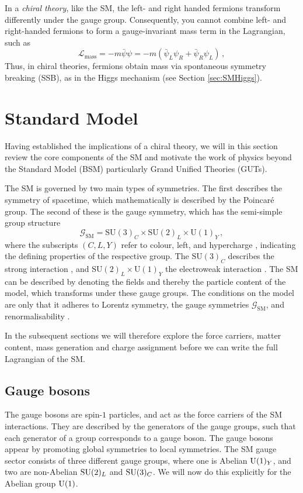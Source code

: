 In a \textit{chiral theory}, like the SM, the left- and right handed fermions transform differently under the gauge group. Consequently, you cannot combine left- and right-handed fermions to form a gauge-invariant mass term in the Lagrangian, such as 
\begin{equation}
    \mathcal{L}_{\text{mass}} = -m\bar{\psi}\psi = -m(\bar{\psi}_L\psi_R + \bar{\psi}_R\psi_L) \,,\label{eq:Chiralmass}
\end{equation}
Thus, in chiral theories, fermions obtain mass via spontaneous symmetry breaking (SSB), as in the Higgs mechanism (see Section \ref{sec:SMHiggs}).

\section{Standard Model} \label{sec:SM} 
Having established the implications of a chiral theory, we will in this section review the core components of the SM and motivate the work of physics beyond the Standard Model (BSM) particularly Grand Unified Theories (GUTs). 

The SM is governed by two main types of symmetries. The first describes the symmetry of spacetime, which mathematically is described by the Poincaré group. The second of these is the gauge symmetry, which has the semi-simple group structure
\begin{equation}
    \mathcal{G}_{\mathrm{SM}}=\mathrm{SU}(3)_C\times\mathrm{SU}(2)_L\times\mathrm{U}(1)_Y\,,
\end{equation}
where the subscripts $(C,L,Y)$ refer to colour, left, and hypercharge \cite{Pernow:2021fvb}, indicating the defining properties of the respective group. The $\mathrm{SU}(3)_C$ describes the strong interaction \cite{Politzer:1973fx,Gross:1973id,Weinberg:1973un}, and $\mathrm{SU}(2)_L\times\mathrm{U}(1)_Y$ the electroweak interaction \cite{Glashow:1961tr,Salam:1964ry,Weinberg:1967tq}. The SM can be described by denoting the fields and thereby the particle content of the model, which transforms under these gauge groups. The conditions on the model are only that it adheres to Lorentz symmetry, the gauge symmetries $\mathcal{G}_{\mathrm{SM}}$, and renormalisability \cite{Pernow:2021fvb}. 

In the subsequent sections we will therefore explore the force carriers, matter content, mass generation and charge assignment before we can write the full Lagrangian of the SM.

\subsection{Gauge bosons}
The gauge bosons are spin-$1$ particles, and act as the force carriers of the SM interactions. They are described by the generators of the gauge groups, such that each generator of a group corresponds to a gauge boson. The gauge bosons appear by promoting global symmetries to local symmetries. The SM gauge sector consists of three different gauge groups, where one is Abelian $\mathrm{U}(1)_Y$, and two are non-Abelian $\mathrm{SU}(2)_L$ and $\mathrm{SU}(3)_C$. We will now do this explicitly for the Abelian group $\mathrm{U}(1)$. 

